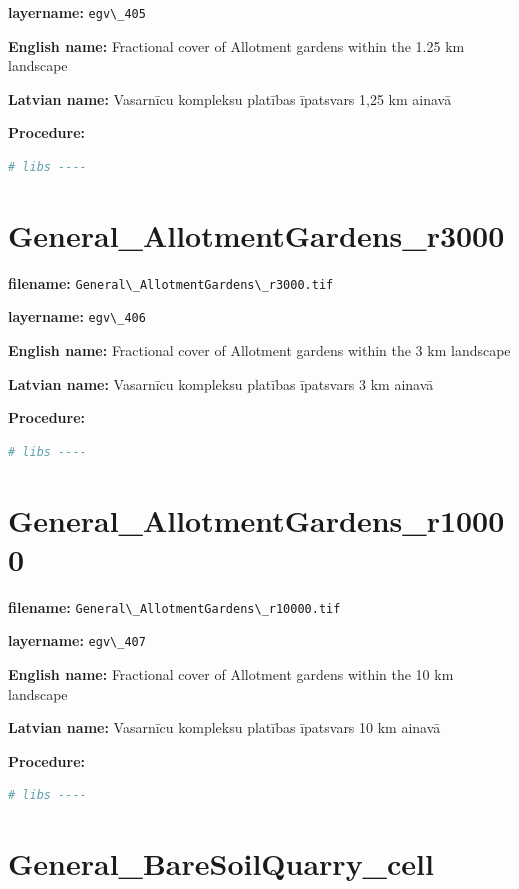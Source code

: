 \documentclass[
]{book}
\newcommand{\passthrough}[1]{#1}
\begin{document}
\textbf{layername:} \passthrough{\lstinline!egv\_405!}

\textbf{English name:} Fractional cover of Allotment gardens within the 1.25 km landscape

\textbf{Latvian name:} Vasarnīcu kompleksu platības īpatsvars 1,25 km ainavā

\textbf{Procedure:}

\begin{lstlisting}[language=R]
# libs ----
\end{lstlisting}

\section{General\_AllotmentGardens\_r3000}\label{ch06.406}

\textbf{filename:} \passthrough{\lstinline!General\_AllotmentGardens\_r3000.tif!}

\textbf{layername:} \passthrough{\lstinline!egv\_406!}

\textbf{English name:} Fractional cover of Allotment gardens within the 3 km landscape

\textbf{Latvian name:} Vasarnīcu kompleksu platības īpatsvars 3 km ainavā

\textbf{Procedure:}

\begin{lstlisting}[language=R]
# libs ----
\end{lstlisting}

\section{General\_AllotmentGardens\_r10000}\label{ch06.407}

\textbf{filename:} \passthrough{\lstinline!General\_AllotmentGardens\_r10000.tif!}

\textbf{layername:} \passthrough{\lstinline!egv\_407!}

\textbf{English name:} Fractional cover of Allotment gardens within the 10 km landscape

\textbf{Latvian name:} Vasarnīcu kompleksu platības īpatsvars 10 km ainavā

\textbf{Procedure:}

\begin{lstlisting}[language=R]
# libs ----
\end{lstlisting}

\section{General\_BareSoilQuarry\_cell}\label{ch06.408}
\end{document}
